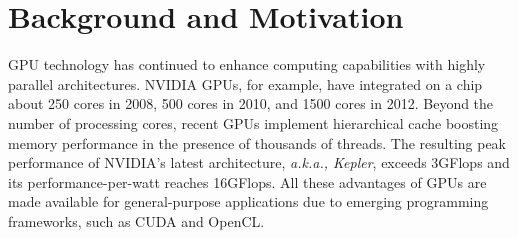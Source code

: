 \section{Background and Motivation}
\label{sec:background}

GPU technology has continued to enhance computing capabilities with
highly parallel architectures.
NVIDIA GPUs, for example, have integrated on a chip about 250 cores in
2008, 500 cores in 2010, and 1500 cores in 2012.
Beyond the number of processing cores, recent GPUs implement
hierarchical cache boosting memory performance in the presence of
thousands of threads.
The resulting peak performance of NVIDIA's latest architecture,
\textit{a.k.a., Kepler}, exceeds 3GFlops and its performance-per-watt
reaches 16GFlops.
All these advantages of GPUs are made available for general-purpose
applications due to emerging programming frameworks, such as CUDA and
OpenCL.

